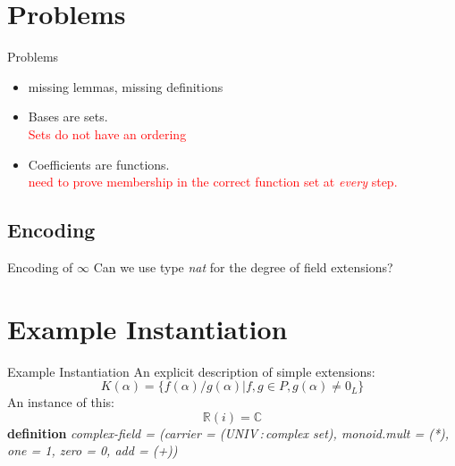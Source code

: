 \documentclass[%
	sans,
	12pt,
]{beamer}
\newcommand{\bad}[1]{\textcolor{red}{#1}}
\newcommand{\RR}{\mathbb{R}}
\newcommand{\CC}{\mathbb{C}}
\newcommand{\hastype}{\,:\,}
\begin{document}
\section{Problems}
\begin{frame}{Problems}\pause
\begin{itemize}
	\item missing lemmas, missing definitions\pause %
	\item Bases are sets.\\\pause
	\bad{Sets do not have an ordering}
	\item Coefficients are functions.\\\pause
	\bad{need to prove membership in the correct function set at \emph{every} step.}
\end{itemize}
\end{frame}

\subsection{Encoding}
\begin{frame}{Encoding of $\infty$}%
Can we use type \emph{nat} for the degree of field extensions?\pause
{}
\end{frame}

\section{Example Instantiation}

\begin{frame}{Example Instantiation}%
An explicit description of simple extensions: %
\[K(\alpha) = \{f(\alpha)/g(\alpha) | f,g \in P, g(\alpha) ≠ \textbf{$0_L$}\}\]\pause
An instance of this:\\
\[\RR(i) = \CC\]\pause
\textbf{definition} \textit{complex-field = (carrier = (UNIV\hastype complex set), monoid.mult = (*), one = 1, zero = 0, add = (+))}
\end{frame}
\end{document}
